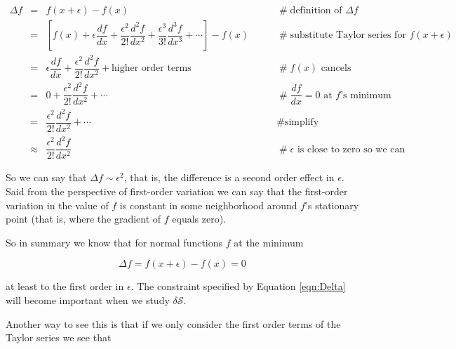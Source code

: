 \documentclass{article}
\theoremstyle{definition}
\begin{document}
\begin{equation*}
\begin{array}{lllll}
\Delta f
&=& f(x + \epsilon) - f(x)                      &\qquad \mathrel{\#} \text{definition of $\Delta f$}  \\
[10pt]
&=&  \left [f(x) + \epsilon \dfrac{df}{dx} + \dfrac{\epsilon^2}{2!} \dfrac{d^2 f}{dx^2} + \dfrac{\epsilon^3}{3!} \dfrac{d^3 f}{dx^3}  + \cdots \right ]  - f(x)  
                                                &\qquad \mathrel{\#} \text{substitute Taylor series for $f(x + \epsilon)$} \\
[10pt]
&=& \epsilon \dfrac{df}{dx} + \dfrac{\epsilon^2}{2!}  \dfrac{d^2 f}{dx^2} +  \text{higher order terms}  \
                                                &\qquad \mathrel{\#} \text{$f(x)$ cancels} \\
[10pt]
&=& 0 + \dfrac{\epsilon^2}{2!} \dfrac{d^2 f}{dx^2} +  \cdots
                                                &\qquad \mathrel{\#} \text{$\dfrac{df}{dx} = 0$ at $f$'s minimum} \\
[10pt]
&=&  \dfrac{\epsilon^2}{2!}  \dfrac{d^2 f}{dx^2}  + \cdots
                                                &\qquad \mathrel{\#} \text{simplify} \\
[10pt]
&\approx& \dfrac{\epsilon^2}{2!} \dfrac{d^2 f}{dx^2}
                                                &\qquad \mathrel{\#} \text{$\epsilon$ is close to zero so we can ignore higher order terms}
\end{array}
\end{equation*}

\bigskip
\noindent
So we can say that $\Delta f \sim \epsilon^2$, that is, the
difference is a second order effect in $\epsilon$. Said from the
perspective of first-order variation we can say that the
first-order variation in the value of $f$ is constant in some
neighborhood around $f$'s stationary point (that is, where the
gradient of $f$ equals zero).   

\bigskip
\noindent
So in summary we know that for normal functions $f$ at the
minimum 

\smallskip
\begin{equation}
\Delta f =  f(x + \epsilon) - f(x)  = 0
\label{eqn:Delta}
\end{equation}

\bigskip
\noindent
at least to the first order in $\epsilon$. The constraint
specified by Equation \ref{eqn:Delta} will become important when
we study $\delta \mathcal{S}$. 

\bigskip
\noindent
Another way to see this is that if we only consider the first
order terms of the Taylor series we see that 
\end{document}
